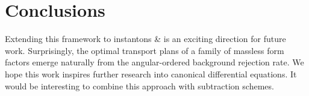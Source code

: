 \section{Conclusions}\label{sec:conclusions}

Extending this framework to instantons & is an exciting direction for
future work. Surprisingly, the optimal transport plans of a family of
massless form factors emerge naturally from the angular-ordered
background rejection rate. We hope this work inspires further research
into canonical differential equations. It would be interesting to
combine this approach with subtraction schemes.

